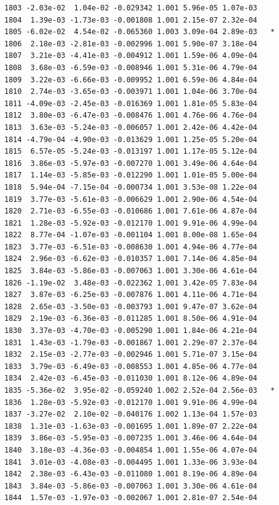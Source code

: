 \documentclass[
  letterpaper,
  DIV=11,
  numbers=noendperiod]{scrartcl}
\begin{document}
\begin{verbatim}
1803 -2.03e-02  1.04e-02 -0.029342 1.001 5.96e-05 1.07e-03    
1804  1.39e-03 -1.73e-03 -0.001808 1.001 2.15e-07 2.32e-04    
1805 -6.02e-02  4.54e-02 -0.065360 1.003 3.09e-04 2.89e-03   *
1806  2.18e-03 -2.81e-03 -0.002996 1.001 5.90e-07 3.18e-04    
1807  3.21e-03 -4.41e-03 -0.004912 1.001 1.59e-06 4.09e-04    
1808  3.68e-03 -6.59e-03 -0.008946 1.001 5.31e-06 4.79e-04    
1809  3.22e-03 -6.66e-03 -0.009952 1.001 6.59e-06 4.84e-04    
1810  2.74e-03 -3.65e-03 -0.003971 1.001 1.04e-06 3.70e-04    
1811 -4.09e-03 -2.45e-03 -0.016369 1.001 1.81e-05 5.83e-04    
1812  3.80e-03 -6.47e-03 -0.008476 1.001 4.76e-06 4.76e-04    
1813  3.63e-03 -5.24e-03 -0.006057 1.001 2.42e-06 4.42e-04    
1814 -4.79e-04 -4.90e-03 -0.013629 1.001 1.25e-05 5.20e-04    
1815  6.57e-05 -5.24e-03 -0.013197 1.001 1.17e-05 5.12e-04    
1816  3.86e-03 -5.97e-03 -0.007270 1.001 3.49e-06 4.64e-04    
1817  1.14e-03 -5.85e-03 -0.012290 1.001 1.01e-05 5.00e-04    
1818  5.94e-04 -7.15e-04 -0.000734 1.001 3.53e-08 1.22e-04    
1819  3.77e-03 -5.61e-03 -0.006629 1.001 2.90e-06 4.54e-04    
1820  2.71e-03 -6.55e-03 -0.010686 1.001 7.61e-06 4.87e-04    
1821  1.28e-03 -5.92e-03 -0.012170 1.001 9.91e-06 4.99e-04    
1822  8.77e-04 -1.07e-03 -0.001104 1.001 8.00e-08 1.65e-04    
1823  3.77e-03 -6.51e-03 -0.008630 1.001 4.94e-06 4.77e-04    
1824  2.96e-03 -6.62e-03 -0.010357 1.001 7.14e-06 4.85e-04    
1825  3.84e-03 -5.86e-03 -0.007063 1.001 3.30e-06 4.61e-04    
1826 -1.19e-02  3.48e-03 -0.022362 1.001 3.42e-05 7.83e-04    
1827  3.87e-03 -6.25e-03 -0.007876 1.001 4.11e-06 4.71e-04    
1828  2.65e-03 -3.50e-03 -0.003793 1.001 9.47e-07 3.62e-04    
1829  2.19e-03 -6.36e-03 -0.011285 1.001 8.50e-06 4.91e-04    
1830  3.37e-03 -4.70e-03 -0.005290 1.001 1.84e-06 4.21e-04    
1831  1.43e-03 -1.79e-03 -0.001867 1.001 2.29e-07 2.37e-04    
1832  2.15e-03 -2.77e-03 -0.002946 1.001 5.71e-07 3.15e-04    
1833  3.79e-03 -6.49e-03 -0.008553 1.001 4.85e-06 4.77e-04    
1834  2.42e-03 -6.45e-03 -0.011030 1.001 8.12e-06 4.89e-04    
1835 -5.36e-02  3.95e-02 -0.059240 1.002 2.52e-04 2.56e-03   *
1836  1.28e-03 -5.92e-03 -0.012170 1.001 9.91e-06 4.99e-04    
1837 -3.27e-02  2.10e-02 -0.040176 1.002 1.13e-04 1.57e-03    
1838  1.31e-03 -1.63e-03 -0.001695 1.001 1.89e-07 2.22e-04    
1839  3.86e-03 -5.95e-03 -0.007235 1.001 3.46e-06 4.64e-04    
1840  3.18e-03 -4.36e-03 -0.004854 1.001 1.55e-06 4.07e-04    
1841  3.01e-03 -4.08e-03 -0.004495 1.001 1.33e-06 3.93e-04    
1842  2.38e-03 -6.43e-03 -0.011080 1.001 8.19e-06 4.89e-04    
1843  3.84e-03 -5.86e-03 -0.007063 1.001 3.30e-06 4.61e-04    
1844  1.57e-03 -1.97e-03 -0.002067 1.001 2.81e-07 2.54e-04    

\end{verbatim}
\end{document}
